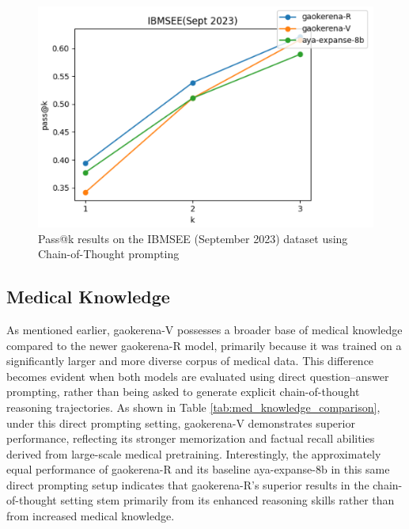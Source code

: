 \documentclass[conference]{IEEEtran}
\begin{document}
\begin{figure}[h]
    \centering
    \includegraphics[width=0.8\linewidth]{fig5.png}
    \caption{Pass@k results on the IBMSEE (September 2023) dataset using Chain-of-Thought prompting}
    \label{fig5}
\end{figure}

           \subsection{Medical Knowledge}
As mentioned earlier, gaokerena-V possesses a broader base of medical knowledge compared to the newer gaokerena-R model, primarily because it was trained on a significantly larger and more diverse corpus of medical data.  
This difference becomes evident when both models are evaluated using direct question–answer prompting, rather than being asked to generate explicit chain-of-thought reasoning trajectories.  
As shown in Table
\ref{tab:med_knowledge_comparison}, under this direct prompting setting, gaokerena-V demonstrates superior performance, reflecting its stronger memorization and factual recall abilities derived from large-scale medical pretraining.  
Interestingly, the approximately equal performance of gaokerena-R and its baseline aya-expanse-8b in this same direct prompting setup indicates that gaokerena-R’s superior results in the chain-of-thought setting stem primarily from its enhanced reasoning skills rather than from increased medical knowledge.
 
\end{document}
